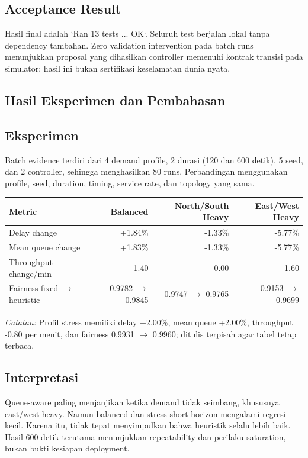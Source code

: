 \documentclass[12pt]{article}
\begin{document}
\subsection{Acceptance Result}
Hasil final adalah `Ran 13 tests ... OK`. Seluruh test berjalan lokal tanpa dependency tambahan. Zero validation intervention pada batch runs menunjukkan proposal yang dihasilkan controller memenuhi kontrak transisi pada simulator; hasil ini bukan sertifikasi keselamatan dunia nyata.

\subsection{Hasil Eksperimen dan Pembahasan}
\subsection{Eksperimen}
Batch evidence terdiri dari 4 demand profile, 2 durasi (120 dan 600 detik), 5 seed, dan 2 controller, sehingga menghasilkan 80 runs. Perbandingan menggunakan profile, seed, duration, timing, service rate, dan topology yang sama.

\begin{longtable}{p{} r r r}
\toprule
\textbf{Metric} & \textbf{Balanced} & \textbf{North/South Heavy} & \textbf{East/West Heavy}\\
\midrule
Delay change & +1.84\% & -1.33\% & -5.77\%\\
Mean queue change & +1.83\% & -1.33\% & -5.77\%\\
Throughput change/min & -1.40 & 0.00 & +1.60\\
Fairness fixed $\rightarrow$ heuristic & 0.9782 $\rightarrow$ 0.9845 & 0.9747 $\rightarrow$ 0.9765 & 0.9153 $\rightarrow$ 0.9699\\
\bottomrule
\end{longtable}
\noindent\textit{Catatan:} Profil stress memiliki delay +2.00\%, mean queue +2.00\%, throughput -0.80 per menit, dan fairness 0.9931 $\rightarrow$ 0.9960; ditulis terpisah agar tabel tetap terbaca.

\subsection{Interpretasi}
Queue-aware paling menjanjikan ketika demand tidak seimbang, khususnya east/west-heavy. Namun balanced dan stress short-horizon mengalami regresi kecil. Karena itu, tidak tepat menyimpulkan bahwa heuristik selalu lebih baik. Hasil 600 detik terutama menunjukkan repeatability dan perilaku saturation, bukan bukti kesiapan deployment.
\end{document}

